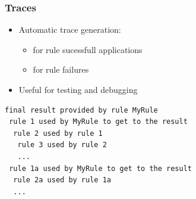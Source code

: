 \begin{frame}[fragile]
\frametitle{Traces}

\begin{itemize}
  \item Automatic trace generation:
  \begin{itemize}
    \item for rule sucessfull applications
    \item for rule failures
  \end{itemize}
  \item Useful for testing and debugging
\end{itemize}

\medskip

\begin{footnotesize}
\begin{verbatim}
final result provided by rule MyRule
 rule 1 used by MyRule to get to the result
  rule 2 used by rule 1
   rule 3 used by rule 2
   ...
 rule 1a used by MyRule to get to the result
  rule 2a used by rule 1a
  ...
\end{verbatim}
\end{footnotesize}

\end{frame}
